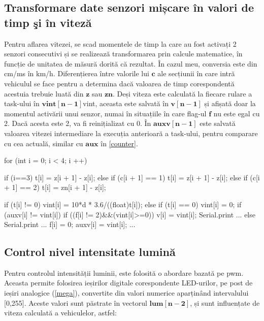\subsection{Transformare date senzori mișcare în valori de timp \c{s}i \^{i}n vitez\u{a}}
Pentru aflarea vitezei, se scad momentele de timp la care au fost activați 2 senzori consecutivi și se realizează transformarea prin calcule matematice, în funcție de unitatea de măsură dorită că rezultat. În cazul meu, conversia este din cm/ms în km/h. Diferențierea între valorile lui $\mathbf{c}$ ale secțiunii în care intră vehiculul se face pentru a determina dacă valoarea de timp corespondentă acestuia trebuie luată din $\mathbf{z}$ sau $\mathbf{zn}$. Deși viteza este calculată la fiecare rulare a task-ului în $\mathbf{vint[n-1]}$vint, aceasta este salvată în $\mathbf{v[n-1]}$ și afișată doar la momentul activării unui senzor, numai în situațiile în care flag-ul $\mathbf{f}$ nu este egal cu 2. Dacă acesta este 2, va fi reinițializat cu 0. În $\mathbf{auxv[n-1]}$ este salvată valoarea vitezei intermediare la execuția anterioară a task-ului, pentru comparare cu cea actuală, similar cu $\mathbf{aux}$ în \autoref{counter}.

\begin{verbnobox}[\verbarg]
for (int i = 0; i < 4; i ++) {
      if (i==3)
        t[i] = z[i + 1] - z[i];
      else if (c[i + 1] == 1)
        t[i] = z[i + 1] - z[i];
      else if (c[i + 1] == 2)
        t[i] = zn[i + 1] - z[i];
      
      if (t[i] != 0)
        vint[i] = 10*d * 3.6/((float)t[i]);
      else if (t[i] == 0) 
        vint[i] = 0;
      if (auxv[i] != vint[i]){
        if ((f[i] != 2)&&(vint[i]>=0)){
          v[i] = vint[i];
          Serial.print ... 
        }
        else {
          Serial.print ...
          f[i] = 0;
        }
      }  
      auxv[i] = vint[i];
      ...
   }
\end{verbnobox}




\subsection{Control nivel intensitate lumină}

 Pentru controlul intensității luminii, este folosită o abordare bazată pe \gls{pwm}. Aceasta permite folosirea ieșirilor digitale corespondente LED-urilor, pe post de ieșiri analogice (\autoref{mega}), convertite din valori numerice aparținând intervalului [0,255]. Aceste valori sunt păstrate în vectorul $\mathbf{lum[n-2]}$, și sunt influențate de viteza calculată a vehiculelor, astfel:

